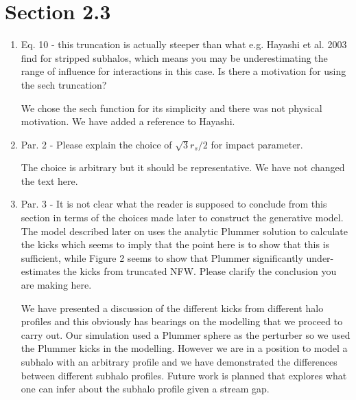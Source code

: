 \documentclass{article}
\begin{document}
\section{Section 2.3}
\begin{enumerate}


\item Eq. 10 - this truncation is actually steeper than what e.g. Hayashi et al. 2003 find for
stripped subhalos, which means you may be underestimating the range of influence for
interactions in this case. Is there a motivation for using the sech truncation?

{\color{red} We chose the sech function for its simplicity and there was not physical motivation. We have added a reference to Hayashi.}

\item Par. 2 - Please explain the choice of $\sqrt{3} r_s/2$ for impact parameter.

{\color{red} The choice is arbitrary but it should be representative. We have not changed the text here.}

\item Par. 3 - It is not clear what the reader is supposed to conclude from this section in terms
of the choices made later to construct the generative model. The model described later
on uses the analytic Plummer solution to calculate the kicks which seems to imply that
the point here is to show that this is sufficient, while Figure 2 seems to show that
Plummer significantly under-estimates the kicks from truncated NFW. Please clarify the
conclusion you are making here.

{\color{red} We have presented a discussion of the different kicks from different halo profiles and this obviously has bearings on the modelling that we proceed to carry out. Our simulation used a Plummer sphere as the perturber so we used the Plummer kicks in the modelling. However we are in a position to model a subhalo with an arbitrary profile and we have demonstrated the differences between different subhalo profiles. Future work is planned that explores what one can infer about the subhalo profile given a stream gap.}

\end{enumerate}
\end{document}
